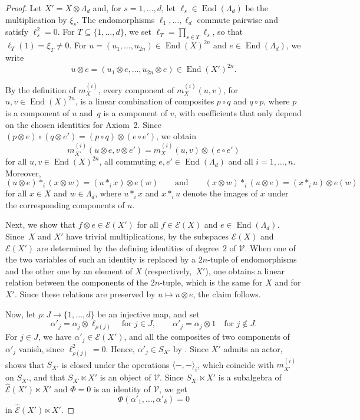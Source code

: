 \documentclass[reqno,a4paper]{amsart}
\theoremstyle{plain}
\theoremstyle{definition}
\theoremstyle{remark}
\numberwithin{equation}{section}
\newcommand{\E}{\mathcal{E}}
\newcommand{\V}{\mathcal{V}}
\DeclareMathOperator{\End}{End}
\begin{document}
\begin{proof}
Let $X'=X\otimes\Lambda_d$ and, for $s=1,\ldots,d$, let $\ell_s\in\End(\Lambda_d)$ be the multiplication by $\xi_s$. The endomorphisms $\ell_1,\ldots,\ell_d$ commute pairwise and satisfy $\ell_s^2=0$. For $T\subseteq\{1,\ldots,d\}$, we set $\ell_T=\prod_{s\in T}\ell_s$, so that $\ell_T(1)=\xi_T\neq0$. For $u=(u_1,\ldots,u_{2n})\in\End(X)^{2n}$ and $e\in\End(\Lambda_d)$, we write
\[
u\otimes e=(u_1\otimes e,\ldots,u_{2n}\otimes e)\in\End(X')^{2n}.
\]

By the definition of $m_X^{(i)}$, every component of $m_X^{(i)}(u,v)$, for $u,v\in\End(X)^{2n}$, is a linear combination of composites $p\circ q$ and $q\circ p$, where $p$ is a component of $u$ and~$q$ is a component of $v$, with coefficients that only depend on the chosen identities for Axiom~2. Since $(p\otimes e)\circ(q\otimes e')=(p\circ q)\otimes(e\circ e')$, we obtain
\begin{equation}\label{EqTensorProducts}
m_{X'}^{(i)}(u\otimes e,v\otimes e')=m_X^{(i)}(u,v)\otimes(e\circ e')
\end{equation}
for all $u,v\in\End(X)^{2n}$, all commuting $e,e'\in\End(\Lambda_d)$ and all $i=1,\ldots,n$. Moreover,
\[
(u\otimes e)\ast_i(x\otimes w)=(u\ast_ix)\otimes e(w)
\qquad\text{and}\qquad
(x\otimes w)\ast_i(u\otimes e)=(x\ast_iu)\otimes e(w)
\]
for all $x\in X$ and $w\in\Lambda_d$, where $u\ast_ix$ and $x\ast_iu$ denote the images of $x$ under the corresponding components of $u$.

Next, we show that $f\otimes e\in\E(X')$ for all $f\in\E(X)$ and $e\in\End(\Lambda_d)$. Since~$X$ and $X'$ have trivial multiplications, by  the subspaces $\E(X)$ and $\E(X')$ are determined by the defining identities of degree~$2$ of $\V$. When one of the two variables of such an identity is replaced by a $2n$-tuple of endomorphisms and the other one by an element of $X$ (respectively,~$X'$), one obtains a linear relation between the components of the $2n$-tuple, which is the same for $X$ and for $X'$. Since these relations are preserved by $u\mapsto u\otimes e$, the claim follows.

Now, let $\rho\colon J\to\{1,\ldots,d\}$ be an injective map, and set
\[
\alpha'_j=\alpha_j\otimes\ell_{\rho(j)}\quad\text{for } j\in J,
\qquad
\alpha'_j=\alpha_j\otimes1\quad\text{for } j\notin J.
\]
For $j\in J$, we have $\alpha'_j\in\E(X')$, and all the composites of two components of $\alpha'_j$ vanish, since $\ell_{\rho(j)}^2=0$. Hence, $\alpha'_j\in S_{X'}$ by . Since $X'$ admits an actor,  shows that $S_{X'}$ is closed under the operations $\langle-,-\rangle_i$, which coincide with $m_{X'}^{(i)}$ on $S_{X'}$, and that $S_{X'}\ltimes X'$ is an object of $\V$. Since $S_{X'}\ltimes X'$ is a subalgebra of $\widehat{\E}(X')\ltimes X'$ and $\Phi=0$ is an identity of $\V$, we get
\[
\Phi(\alpha'_1,\ldots,\alpha'_k)=0
\]
in $\widehat{\E}(X')\ltimes X'$.


\end{proof}
\end{document}
